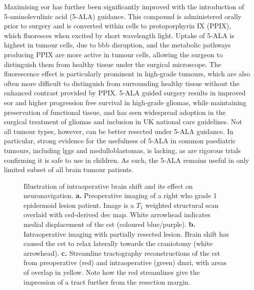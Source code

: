 Maximising \gls{eor} has further been significantly improved with the introduction of 5-aminolevulinic acid (5-ALA) guidance.
This compound is administered orally prior to surgery and is converted within cells to protoporphyrin IX (PPIX), which fluoresces when excited by short wavelength light.
Uptake of 5-ALA is highest in tumour cells, due to \gls{bbb} disruption, and the metabolic pathways producing PPIX are more active in tumour cells, allowing the surgeon to distinguish them from healthy tissue under the surgical microscope.
The fluorescence effect is particularly prominent in high-grade tumours, which are also often more difficult to distinguish from surrounding healthy tissue without the enhanced contrast provided by PPIX.
5-ALA guided surgery results in improved \gls{eor} and higher progression free survival in high-grade gliomas, while maintaining preservation of functional tissue\autocite{Coburger2019,Golub2020}, and has seen widespread adoption in the surgical treatment of gliomas\autocite{Stummer2006} and inclusion in UK national care guidelines\autocite{NICE2021}.
Not all tumour types, however, can be better resected under 5-ALA guidance.
In particular, strong evidence for the usefulness of 5-ALA in common paediatric tumours, including \glspl{lgg} and medulloblastomas, is lacking, as are rigorous trials confirming it is safe to use in children\autocite{Schwake2019}.
As such, the 5-ALA remains useful in only limited subset of all brain tumour patients.

\begin{figure}
  
  \caption[Intraoperative brain shift]{Illustration of intraoperative brain shift and its effect on neuronavigation.
  \textbf{\sffamily a.} Preoperative imaging of a right \gls{who} grade 1 epidermoid lesion patient. Image is a $T_1$ weighted structural scan overlaid with \gls{csd}-derived \gls{dec} map. White arrowhead indicates medial displacement of the \gls{cst} (coloured blue/purple).
  \textbf{\sffamily b.} Intraoperative imaging with partially resected lesion. Brain shift has caused the \gls{cst} to relax laterally towards the craniotomy (white arrowhead).
  \textbf{\sffamily c.} Streamline tractography reconstructions of the \gls{cst} from preoperative (red) and intraoperative (green) \gls{dmri}, with areas of overlap in yellow. Note how the red streamlines give the impression of a tract further from the resection margin.}
  \label{fig:shift}
\end{figure}

